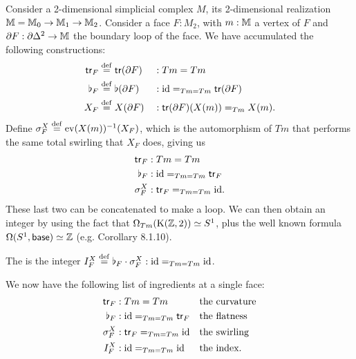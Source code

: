 Consider a 2-dimensional simplicial complex \( M \), its 2-dimensional realization \( \mathbb{M}=\mathbb{M}_0\to\mathbb{M}_1\to\mathbb{M}_2 \). Consider a face \( F:M_2 \), with \( m:\mathbb{M} \) a vertex of \( F \) and \( \partial F:\partial\Delta^2\to\mathbb{M} \) the boundary loop of the face. We have accumulated the following constructions:
\[\begin{aligned}
\mathsf{tr}_F&\stackrel{\mathrm{def}}{=} \mathsf{tr}(\partial F)&&:Tm=Tm\\
\flat_F&\stackrel{\mathrm{def}}{=} \flat(\partial F)&&:\text{id}=_{Tm=Tm}\mathsf{tr}(\partial F)\\
X_F&\stackrel{\mathrm{def}}{=} X(\partial F)&&:\mathsf{tr}(\partial F)(X(m))=_{Tm}X(m).\\
\end{aligned}\]
Define \( \sigma^X_F\stackrel{\mathrm{def}}{=}\mathrm{ev}(X(m))^{-1}(X_F) \), which is the automorphism of \( Tm \) that performs the same total swirling that \( X_F \) does, giving us
\[\begin{aligned}
\mathsf{tr}_F&:Tm=Tm\\
\flat_F&:\text{id}=_{Tm=Tm}\mathsf{tr}_F\\
\sigma^X_F&:\mathsf{tr}_F=_{Tm=Tm}\text{id}.\\
\end{aligned}\]
These last two can be concatenated to make a loop. We can then obtain an integer by using the fact that \( \Omega_{Tm}(\mathrm{K}(\mathbb{Z},2))\simeq S^1 \), plus the well known formula \( \Omega(S^1,\mathsf{base})\simeq\mathbb{Z} \) (e.g. \cite{hottbook} Corollary 8.1.10).
\begin{mydef}
The  is the integer \( I^X_F\stackrel{\mathrm{def}}{=}\flat_F\cdot \sigma^X_F:\text{id}=_{Tm=Tm}\text{id} \).
\end{mydef}
We now have the following list of ingredients at a single face:
\begin{equation}
\label{eq:face_elements}
\begin{aligned}
\mathsf{tr}_F&:Tm=Tm&&\text{the curvature}\\
\flat_F&:\text{id}=_{Tm=Tm}\mathsf{tr}_F&&\text{the flatness}\\
\sigma^X_F&:\mathsf{tr}_F=_{Tm=Tm}\text{id}&&\text{the swirling}\\
I^X_F&:\text{id}=_{Tm=Tm}\text{id}&&\text{the index}.
\end{aligned}
\end{equation}

